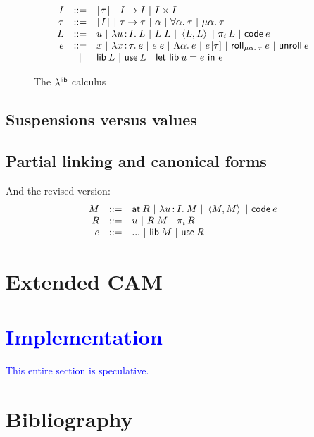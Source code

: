 \documentclass[11pt]{article}
\newcommand{\bscolor}{blue}
\newcommand{\bs}[1]{\textcolor{\bscolor}{#1}}
\begin{document}
\begin{figure}[h]
  \[\begin{array}{rcl}
    I &::=& \lceil{\tau}\rceil ~|~ I \to I ~|~ I \times I\\
    \tau &::=&  \lfloor{I}\rfloor ~|~ \tau \to \tau ~|~ \alpha ~|~ \forall \alpha .\: \tau
    ~|~ \mu \alpha .\: \tau\\
    L &::=& u ~|~ \lambda u \mathop{:} I .\: L ~|~ L \; L ~|~ \left\langle L,L\right\rangle ~|~ \pi_{i} \, L
    ~|~ \textsf{code}\:{e}\\
    e &::=& x ~|~ \lambda x \mathop{:} \tau .\: e ~|~ e \; e
    ~|~ \Lambda \alpha .\: e ~|~ e\hspace{1pt}[\tau]
    ~|~ \textsf{roll}_{\mu \alpha .\: \tau}\:{e} ~|~ \textsf{unroll}\:{e}\\
    &~|~& \textsf{lib}\:{L} ~|~ \textsf{use}\:{L} ~|~ \textsf{let}~{\textsf{lib}\:{u}}={e}~\textsf{in}~{e}
  \end{array}\]
  \label{fig:llib}
  \caption{The $\lambda^{\textsf{lib}}$ calculus}
\end{figure}

\subsection{Suspensions versus values}

\subsection{Partial linking and canonical forms}
And the revised version:
\[\begin{array}{rcl}
  M &::=& \textsf{at}\:{R} ~|~ \lambda u \mathop{:} I .\: M ~|~ \left\langle M,M\right\rangle ~|~ \textsf{code}\:{e}\\
  R &::=& u ~|~ R \; M ~|~ \pi_{i} \, R\\
  e &::=& ... ~|~ \textsf{lib}\:{M} ~|~ \textsf{use}\:{R}
\end{array}\]

\section{Extended CAM}

\section{\bs{Implementation}}

\bs{This entire section is speculative.}


\section{Bibliography}
\end{document}
